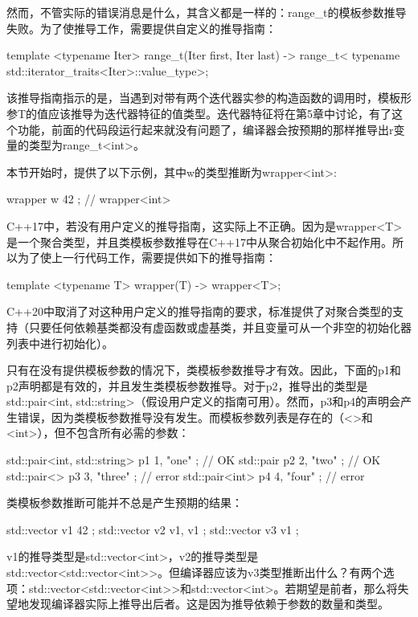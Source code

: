 然而，不管实际的错误消息是什么，其含义都是一样的：range\_t的模板参数推导失败。为了使推导工作，需要提供自定义的推导指南：

\begin{cpp}
template <typename Iter>
range_t(Iter first, Iter last) ->
range_t<
typename std::iterator_traits<Iter>::value_type>;
\end{cpp}

该推导指南指示的是，当遇到对带有两个迭代器实参的构造函数的调用时，模板形参T的值应该推导为迭代器特征的值类型。迭代器特征将在第5章中讨论，有了这个功能，前面的代码段运行起来就没有问题了，编译器会按预期的那样推导出r变量的类型为range\_t<int>。

本节开始时，提供了以下示例，其中w的类型推断为wrapper<int>:

\begin{cpp}
wrapper w{ 42 }; // wrapper<int>
\end{cpp}

C++17中，若没有用户定义的推导指南，这实际上不正确。因为是wrapper<T>是一个聚合类型，并且类模板参数推导在C++17中从聚合初始化中不起作用。所以为了使上一行代码工作，需要提供如下的推导指南：

\begin{cpp}
template <typename T>
wrapper(T) -> wrapper<T>;
\end{cpp}

C++20中取消了对这种用户定义的推导指南的要求，标准提供了对聚合类型的支持（只要任何依赖基类都没有虚函数或虚基类，并且变量可从一个非空的初始化器列表中进行初始化）。

只有在没有提供模板参数的情况下，类模板参数推导才有效。因此，下面的p1和p2声明都是有效的，并且发生类模板参数推导。对于p2，推导出的类型是std::pair<int, std::string>（假设用户定义的指南可用）。然而，p3和p4的声明会产生错误，因为类模板参数推导没有发生。而模板参数列表是存在的（<>和<int>），但不包含所有必需的参数：

\begin{cpp}
std::pair<int, std::string> p1{ 1, "one" }; // OK
std::pair p2{ 2, "two" }; // OK
std::pair<> p3{ 3, "three" }; // error
std::pair<int> p4{ 4, "four" }; // error
\end{cpp}

类模板参数推断可能并不总是产生预期的结果：

\begin{cpp}
std::vector v1{ 42 };
std::vector v2{ v1, v1 };
std::vector v3{ v1 };
\end{cpp}

v1的推导类型是std::vector<int>，v2的推导类型是std::vector<std::vector<int>{}>。但编译器应该为v3类型推断出什么？有两个选项：std::vector<std::vector<int>{}>和std::vector<int>。若期望是前者，那么将失望地发现编译器实际上推导出后者。这是因为推导依赖于参数的数量和类型。

